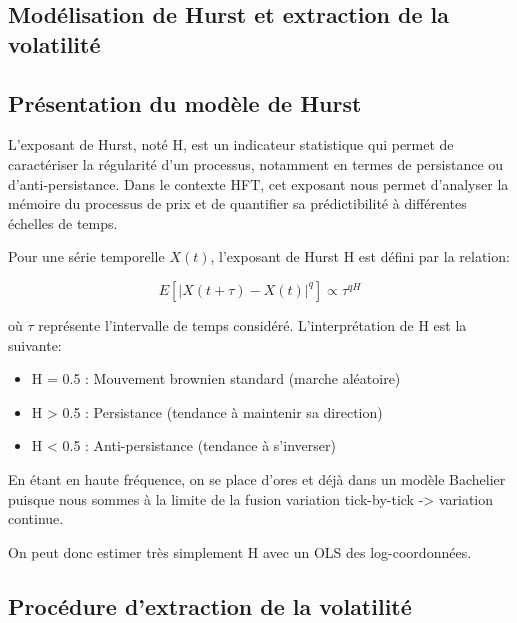 \documentclass[10pt,a4paper]{article}
\theoremstyle{definition}
\theoremstyle{remark}
\begin{document}
\begin{itemize}
\section{Modélisation de Hurst et extraction de la volatilité}

\subsection{Présentation du modèle de Hurst}

L'exposant de Hurst, noté H, est un indicateur statistique qui permet de caractériser la régularité d'un processus, notamment en termes de persistance ou d'anti-persistance. Dans le contexte HFT, cet exposant nous permet d'analyser la mémoire du processus de prix et de quantifier sa prédictibilité à différentes échelles de temps.

Pour une série temporelle \(X(t)\), l'exposant de Hurst H est défini par la relation:

\[
E[|X(t+\tau) - X(t)|^q] \propto \tau^{qH}
\]

où \(\tau\) représente l'intervalle de temps considéré. L'interprétation de H est la suivante:
\begin{itemize}
    \item H = 0.5 : Mouvement brownien standard (marche aléatoire)
    \item H > 0.5 : Persistance (tendance à maintenir sa direction)
    \item H < 0.5 : Anti-persistance (tendance à s'inverser)
\end{itemize}

En étant en haute fréquence, on se place d'ores et déjà dans un modèle Bachelier puisque nous sommes à la limite de la fusion variation tick-by-tick -> variation continue.

On peut donc estimer très simplement H avec un OLS des log-coordonnées.

\subsection{Procédure d'extraction de la volatilité}


\end{itemize}
\end{document}
